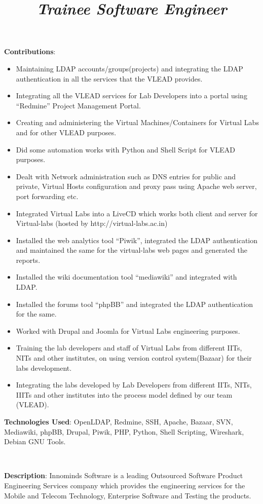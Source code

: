 \begin{resume}
\begin{position}
\textbf{Contributions}:
\begin{itemize}
\item Maintaining LDAP accounts/groups(projects) and integrating the
  LDAP authentication in all the services that the VLEAD provides.
\item Integrating all the VLEAD services for Lab Developers into a
  portal using ``Redmine'' Project Management Portal.
\item Creating and administering the Virtual Machines/Containers for
  Virtual Labs and for other VLEAD purposes.
\item Did some automation works with Python and Shell Script for VLEAD
  purposes.
\item Dealt with Network administration such as DNS entries for public
  and private, Virtual Hosts configuration and proxy pass using Apache
  web server, port forwarding etc.
\item Integrated Virtual Labs into a LiveCD which works both client
  and server for Virtual-labs (hosted by http://virtual-labs.ac.in)
\item Installed the web analytics tool ``Piwik'', integrated the LDAP
  authentication and maintained the same for the virtual-labs web
  pages and generated the reports.
\item Installed the wiki documentation tool ``mediawiki'' and
  integrated with LDAP.
\item Installed the forums tool ``phpBB'' and integrated the LDAP
  authentication for the same.
\item Worked with Drupal and Joomla for Virtual Labs engineering
  purposes.
\item Training the lab developers and staff of Virtual Labs from
  different IITs, NITs and other institutes, on using version control
  system(Bazaar) for their labs development.
\item Integrating the labs developed by Lab Developers from different
  IITs, NITs, IIITs and other institutes into the process model
  defined by our team (VLEAD).

\end{itemize}
\textbf{Technologies Used}: OpenLDAP, Redmine, SSH, Apache, Bazaar,
SVN, Mediawiki, phpBB, Drupal, Piwik, PHP, Python, Shell Scripting,
Wireshark, Debian GNU Tools.
\end{position}
\\
\title{\em \textbf{Trainee Software Engineer}}
\begin{position}
\textbf{Description}: Innominds Software is a leading Outsourced
Software Product Engineering Services company which provides the
engineering services for the Mobile and Telecom Technology, Enterprise
Software and Testing the products.
 

\end{position}
\end{resume}
